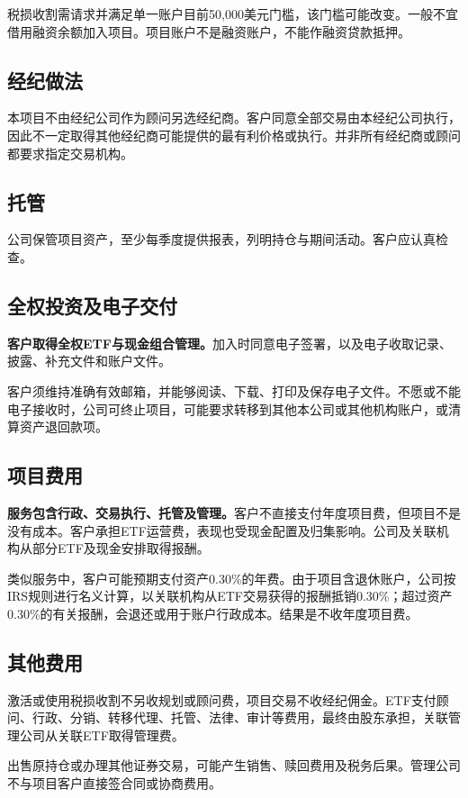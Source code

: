 \documentclass[UTF8,fontset=none,11pt,a4paper]{ctexart}
\begin{document}
税损收割需请求并满足单一账户目前50,000美元门槛，该门槛可能改变。一般不宜借用融资余额加入项目。项目账户不是融资账户，不能作融资贷款抵押。


\subsection*{经纪做法}
本项目不由经纪公司作为顾问另选经纪商。客户同意全部交易由本经纪公司执行，因此不一定取得其他经纪商可能提供的最有利价格或执行。并非所有经纪商或顾问都要求指定交易机构。


\subsection*{托管}
公司保管项目资产，至少每季度提供报表，列明持仓与期间活动。客户应认真检查。


\subsection*{全权投资及电子交付}
\textbf{客户取得全权ETF与现金组合管理。}加入时同意电子签署，以及电子收取记录、披露、补充文件和账户文件。


客户须维持准确有效邮箱，并能够阅读、下载、打印及保存电子文件。不愿或不能电子接收时，公司可终止项目，可能要求转移到其他本公司或其他机构账户，或清算资产退回款项。


\subsection*{项目费用}
\textbf{服务包含行政、交易执行、托管及管理。}客户不直接支付年度项目费，但项目不是没有成本。客户承担ETF运营费，表现也受现金配置及归集影响。公司及关联机构从部分ETF及现金安排取得报酬。


类似服务中，客户可能预期支付资产0.30\%的年费。由于项目含退休账户，公司按IRS规则进行名义计算，以关联机构从ETF交易获得的报酬抵销0.30\%；超过资产0.30\%的有关报酬，会退还或用于账户行政成本。结果是不收年度项目费。


\subsection*{其他费用}
激活或使用税损收割不另收规划或顾问费，项目交易不收经纪佣金。ETF支付顾问、行政、分销、转移代理、托管、法律、审计等费用，最终由股东承担，关联管理公司从关联ETF取得管理费。


出售原持仓或办理其他证券交易，可能产生销售、赎回费用及税务后果。管理公司不与项目客户直接签合同或协商费用。
\end{document}

